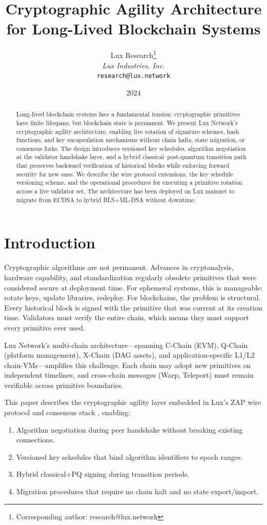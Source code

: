 \documentclass[11pt]{article}
\title{Cryptographic Agility Architecture for Long-Lived Blockchain Systems}
\author{
Lux Research\thanks{Corresponding author: research@lux.network}\\
\textit{Lux Industries, Inc.}\\
\texttt{research@lux.network}
}
\date{2024}
\begin{document}
\luxcoverpage

\begin{abstract}
Long-lived blockchain systems face a fundamental tension: cryptographic primitives have finite lifespans, but blockchain state is permanent. We present Lux Network's cryptographic agility architecture, enabling live rotation of signature schemes, hash functions, and key encapsulation mechanisms without chain halts, state migration, or consensus forks. The design introduces versioned key schedules, algorithm negotiation at the validator handshake layer, and a hybrid classical--post-quantum transition path that preserves backward verification of historical blocks while enforcing forward security for new ones. We describe the wire protocol extensions, the key schedule versioning scheme, and the operational procedures for executing a primitive rotation across a live validator set. The architecture has been deployed on Lux mainnet to migrate from ECDSA to hybrid BLS+ML-DSA without downtime.
\end{abstract}

\section{Introduction}

Cryptographic algorithms are not permanent. Advances in cryptanalysis, hardware capability, and standardization regularly obsolete primitives that were considered secure at deployment time. For ephemeral systems, this is manageable: rotate keys, update libraries, redeploy. For blockchains, the problem is structural. Every historical block is signed with the primitive that was current at its creation time. Validators must verify the entire chain, which means they must support every primitive ever used.

Lux Network's multi-chain architecture---spanning C-Chain (EVM), Q-Chain (platform management), X-Chain (DAG assets), and application-specific L1/L2 chain-VMs---amplifies this challenge. Each chain may adopt new primitives on independent timelines, and cross-chain messages (Warp, Teleport) must remain verifiable across primitive boundaries.

This paper describes the cryptographic agility layer embedded in Lux's ZAP wire protocol \cite{zap-wire} and consensus stack \cite{quasar}, enabling:
\begin{enumerate}
\item Algorithm negotiation during peer handshake without breaking existing connections.
\item Versioned key schedules that bind algorithm identifiers to epoch ranges.
\item Hybrid classical+PQ signing during transition periods.
\item Migration procedures that require no chain halt and no state export/import.
\end{enumerate}
\end{document}
